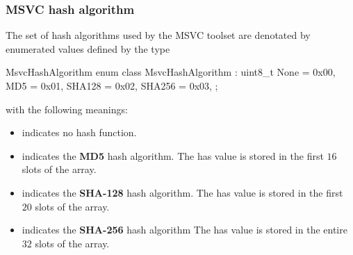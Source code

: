 

\subsubsection{MSVC hash algorithm}

The set of hash algorithms used by the MSVC toolset are denotated by enumerated values defined 
by the type 
%
\begin{typedef}{MsvcHashAlgorithm}{}
	enum class MsvcHashAlgorithm : uint8_t {
		None = 0x00,
		MD5 = 0x01,
		SHA128 = 0x02,
		SHA256 = 0x03,
	};
\end{typedef}
%
with the following meanings:
\begin{itemize}
	\item {} indicates no hash function.
	\item {} indicates the \textbf{MD5} hash algorithm.  
	The has value is stored in the first $16$ slots of the  array.
	\item {} indicates the \textbf{SHA-128} hash algorithm.
	The has value is stored in the first $20$ slots of the  array.
	\item {} indicates the \textbf{SHA-256} hash algorithm 
	The has value is stored in the entire $32$ slots of the  array.
\end{itemize}

